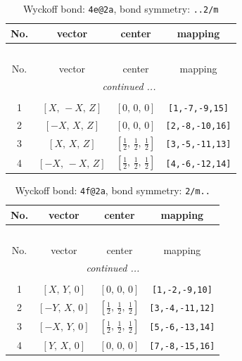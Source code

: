 \documentclass[fleqn,8pt]{jsarticle}
\begin{document}
\renewcommand{\arraystretch}{1.2}
\begin{longtable}{cccc}
\caption{Wyckoff bond: {\tt 4e@2a}, bond symmetry: {\tt ..2/m}}
 \\
 \hline \hline
No. & vector & center & mapping \\ \hline \endfirsthead

\multicolumn{3}{l}{\tablename\ \thetable{}} \\
 \hline \hline
No. & vector & center & mapping \\ \hline \endhead

 \hline \hline
\multicolumn{3}{r}{\footnotesize\it continued ...} \\ \endfoot

 \hline \hline
\multicolumn{3}{r}{} \\ \endlastfoot

1 & $\left[ X,\, - X,\, Z \right]$ & $\left[ 0,\, 0,\, 0 \right]$ & {\tt [1,-7,-9,15]} \\ \hline
2 & $\left[ - X,\, X,\, Z \right]$ & $\left[ 0,\, 0,\, 0 \right]$ & {\tt [2,-8,-10,16]} \\ \hline
3 & $\left[ X,\, X,\, Z \right]$ & $\left[ \frac{1}{2},\, \frac{1}{2},\, \frac{1}{2} \right]$ & {\tt [3,-5,-11,13]} \\ \hline
4 & $\left[ - X,\, - X,\, Z \right]$ & $\left[ \frac{1}{2},\, \frac{1}{2},\, \frac{1}{2} \right]$ & {\tt [4,-6,-12,14]} \\
\end{longtable}
\renewcommand{\arraystretch}{1.2}
\begin{longtable}{cccc}
\caption{Wyckoff bond: {\tt 4f@2a}, bond symmetry: {\tt 2/m..}}
 \\
 \hline \hline
No. & vector & center & mapping \\ \hline \endfirsthead

\multicolumn{3}{l}{\tablename\ \thetable{}} \\
 \hline \hline
No. & vector & center & mapping \\ \hline \endhead

 \hline \hline
\multicolumn{3}{r}{\footnotesize\it continued ...} \\ \endfoot

 \hline \hline
\multicolumn{3}{r}{} \\ \endlastfoot

1 & $\left[ X,\, Y,\, 0 \right]$ & $\left[ 0,\, 0,\, 0 \right]$ & {\tt [1,-2,-9,10]} \\ \hline
2 & $\left[ - Y,\, X,\, 0 \right]$ & $\left[ \frac{1}{2},\, \frac{1}{2},\, \frac{1}{2} \right]$ & {\tt [3,-4,-11,12]} \\ \hline
3 & $\left[ - X,\, Y,\, 0 \right]$ & $\left[ \frac{1}{2},\, \frac{1}{2},\, \frac{1}{2} \right]$ & {\tt [5,-6,-13,14]} \\ \hline
4 & $\left[ Y,\, X,\, 0 \right]$ & $\left[ 0,\, 0,\, 0 \right]$ & {\tt [7,-8,-15,16]} \\
\end{longtable}
\end{document}
